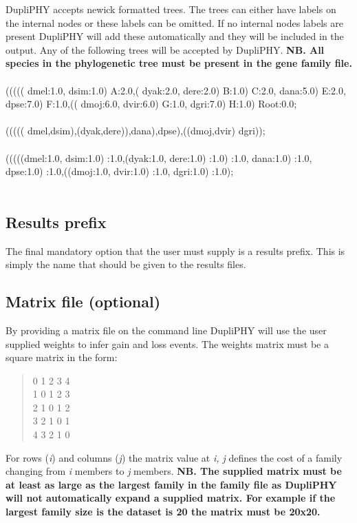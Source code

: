 \documentclass[10pt]{report}
\newcommand{\tab}{\hspace*{2em}}
\begin{document}
DupliPHY accepts newick formatted trees. The trees can either have labels on the internal nodes or these labels can be omitted. If no internal nodes labels are present DupliPHY will add these automatically and they will be included in the output. Any of the following trees will be accepted by DupliPHY. {\bf NB. All species in the phylogenetic tree must be present in the gene family file.}\\
\\
((((( dmel:1.0, dsim:1.0) A:2.0,( dyak:2.0, dere:2.0) B:1.0) C:2.0, dana:5.0) E:2.0, dpse:7.0) F:1.0,(( dmoj:6.0, dvir:6.0) G:1.0, dgri:7.0) H:1.0) Root:0.0; \\
\\
((((( dmel,dsim),(dyak,dere)),dana),dpse),((dmoj,dvir) dgri));\\
\\
(((((dmel:1.0, dsim:1.0) :1.0,(dyak:1.0, dere:1.0) :1.0) :1.0, dana:1.0) :1.0, dpse:1.0) :1.0,((dmoj:1.0, dvir:1.0) :1.0, dgri:1.0) :1.0);\\
\\

\subsection{Results prefix}
\label{sec:results}

The final mandatory option that the user must supply is a results prefix. This is simply the name that should be given to the results files.

\subsection{Matrix file (optional)}
\label{sec:matrix}

By providing a matrix file on the command line DupliPHY will use the user supplied weights to infer gain and loss events. The weights matrix must be a square matrix in the form:

\begin{quote}
0 \tab 1 \tab 2 \tab 3 \tab 4\\
1 \tab 0 \tab 1 \tab 2 \tab 3\\
2 \tab 1 \tab 0 \tab 1 \tab 2\\
3 \tab 2 \tab 1 \tab 0 \tab 1\\
4 \tab 3 \tab 2 \tab 1 \tab 0\\
\end{quote}

For rows ({\it i}) and columns ({\it j}) the matrix value at {\it i, j} defines the cost of a family changing from {\it i} members to {\it j} members. {\bf NB. The supplied matrix must be at least as large as the largest family in the family file as DupliPHY will not automatically expand a supplied matrix. For example if the largest family size is the dataset is 20 the matrix must be 20x20.}
\end{document}
